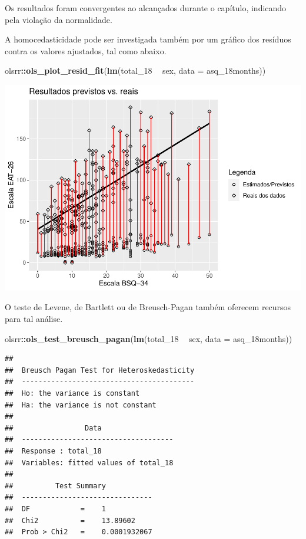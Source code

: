 \documentclass[
]{book}
\newenvironment{Shaded}{\begin{snugshade}}{\end{snugshade}}
\newcommand{\DataTypeTok}[1]{\textcolor[rgb]{0.13,0.29,0.53}{#1}}
\newcommand{\DecValTok}[1]{\textcolor[rgb]{0.00,0.00,0.81}{#1}}
\newcommand{\KeywordTok}[1]{\textcolor[rgb]{0.13,0.29,0.53}{\textbf{#1}}}
\newcommand{\NormalTok}[1]{#1}
\newcommand{\OperatorTok}[1]{\textcolor[rgb]{0.81,0.36,0.00}{\textbf{#1}}}
\newcommand{\StringTok}[1]{\textcolor[rgb]{0.31,0.60,0.02}{#1}}
\begin{document}
Os resultados foram convergentes ao alcançados durante o capítulo,
indicando pela violação da normalidade.

A homocedasticidade pode ser investigada também por um gráfico dos
resíduos contra os valores ajustados, tal como abaixo.

\begin{Shaded}
\begin{Highlighting}[]
\NormalTok{olsrr}\OperatorTok{::}\KeywordTok{ols_plot_resid_fit}\NormalTok{(}\KeywordTok{lm}\NormalTok{(total_}\DecValTok{18} \OperatorTok{~}\StringTok{ }\NormalTok{sex, }\DataTypeTok{data =}\NormalTok{ asq_18months))}
\end{Highlighting}
\end{Shaded}

\begin{center}\includegraphics{gitbook-demo_files/figure-latex/unnamed-chunk-84-1} \end{center}

O teste de Levene, de Bartlett ou de Breusch-Pagan também oferecem
recursos para tal análise.

\begin{Shaded}
\begin{Highlighting}[]
\NormalTok{olsrr}\OperatorTok{::}\KeywordTok{ols_test_breusch_pagan}\NormalTok{(}\KeywordTok{lm}\NormalTok{(total_}\DecValTok{18} \OperatorTok{~}\StringTok{ }\NormalTok{sex, }\DataTypeTok{data =}\NormalTok{ asq_18months))}
\end{Highlighting}
\end{Shaded}

\begin{verbatim}
## 
##  Breusch Pagan Test for Heteroskedasticity
##  -----------------------------------------
##  Ho: the variance is constant            
##  Ha: the variance is not constant        
## 
##                 Data                 
##  ------------------------------------
##  Response : total_18 
##  Variables: fitted values of total_18 
## 
##          Test Summary           
##  -------------------------------
##  DF            =    1 
##  Chi2          =    13.89602 
##  Prob > Chi2   =    0.0001932067
\end{verbatim}
\end{document}
